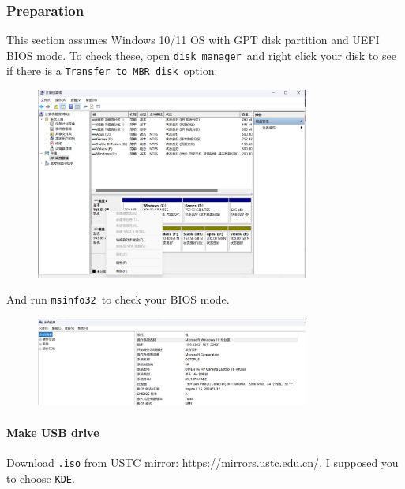 \documentclass[12pt]{ctexart}
\newenvironment{mdquote}
{%
  \par\noindent
  \begin{list}{}{%
      \setlength{\leftmargin}{1em}%
      \setlength{\rightmargin}{0pt}%
      \setlength{\itemindent}{0pt}%
      \setlength{\listparindent}{\parindent}%
      \setlength{\topsep}{0.5\baselineskip}%
  }
  \item[\textbf{>}\ ]\itshape
}
{\end{list}\par}
\begin{document}
\subsubsection*{\textbf{Preparation}}

\begin{mdquote}
This section assumes Windows 10/11 OS with GPT disk partition and UEFI
BIOS mode. To check these, open \texttt{disk\ manager}\ and right click
your disk to see if there is a \texttt{Transfer\ to\ MBR\ disk}\ option.

\begin{figure}[H]
    \centering
    \includegraphics[width=0.8\textwidth,keepaspectratio]{assets/Linux/3.1 Seek common ground while reserving differences/2.png}
\end{figure}

And run \texttt{msinfo32}\ to check your BIOS mode.

\begin{figure}[H]
    \centering
    \includegraphics[width=0.8\textwidth,keepaspectratio]{assets/Linux/3.1 Seek common ground while reserving differences/3.png}
\end{figure}

\end{mdquote}

\paragraph{\textbf{Make USB drive}}\par
\vspace{1em}
Download \texttt{.iso} from USTC mirror:
\url{https://mirrors.ustc.edu.cn/}. I supposed you to choose
\texttt{KDE}.
\end{document}

